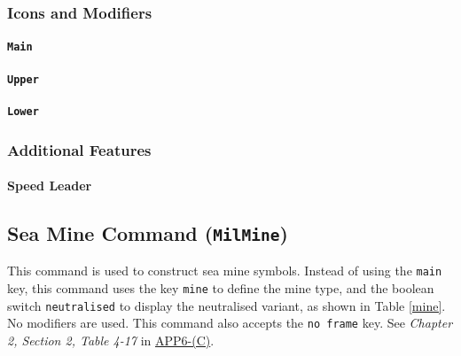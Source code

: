 \documentclass[a4paper, titlepage]{article}
\newcommand\DocLink{\href{https://www.awl.edu.pl/images/en/APP_6_C.pdf}{APP6-(C)}}
\begin{document}
\subsubsection{Icons and Modifiers}

\paragraph{\texttt{Main}}
%

\paragraph{\texttt{Upper}}
%

\paragraph{\texttt{Lower}}
%

\subsubsection{Additional Features}

\paragraph{Speed Leader}

\subsection{Sea Mine Command (\textbf{\texttt{MilMine}})}

This command is used to construct sea mine symbols. Instead of using the \texttt{main} key, this command uses the key \texttt{mine} to define the mine type, and the boolean switch \texttt{neutralised} to display the neutralised variant, as shown in Table \ref{mine}. No modifiers are used. This command also accepts the \texttt{no frame} key. See \textit{Chapter 2, Section 2, Table 4-17} in \DocLink.
\end{document}
